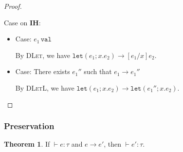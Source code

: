 \documentclass{article}
\theoremstyle{definition}
\newtheorem{theorem}{Theorem}[section]
\begin{document}
\begin{proof}
\begin{itemize}
              Case on \textbf{IH}:
              \begin{itemize}
                  \item Case: $e_1\, \mathtt{val}$

                        By \textsc{DLet}, we have $\mathtt{let}(e_1;x.e_2) \longrightarrow [e_1/x]e_2$.

                  \item Case: There exists $e_1''$ such that $e_1 \longrightarrow e_1''$

                        By \textsc{DLetL}, we have $\mathtt{let}(e_1;x.e_2) \longrightarrow \mathtt{let}(e_1'';x.e_2)$.
              \end{itemize}
    \end{itemize}
\end{proof}

\subsubsection*{Preservation}

\begin{theorem}
    If $\vdash e:\tau$ and $e\longrightarrow e'$, then $\vdash e':\tau$.
\end{theorem}
\end{document}
